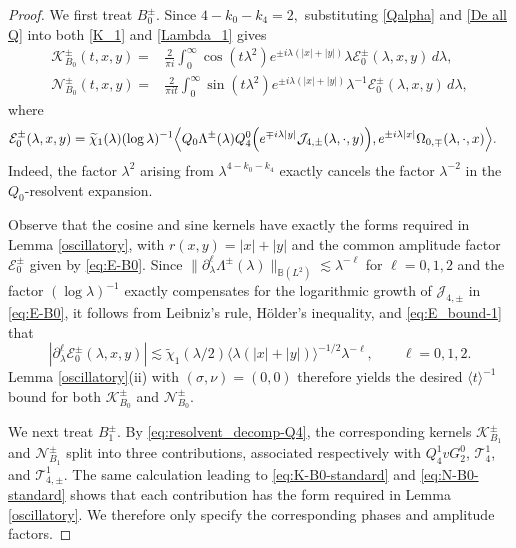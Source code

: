\documentclass[reqno]{amsart}
\numberwithin{equation}{section}
\begin{document}
\begin{proof}
	We first treat $B_0^\pm$. Since
	$
	4-k_0-k_4=2,
	$
	substituting \eqref{Qalpha} and \eqref{De all Q} into both
	\eqref{K_1} and \eqref{Lambda_1} gives
	\begin{align}
		\mathcal{K}_{B_0}^\pm(t,x,y)
		={}&
		\frac{2}{\pi i}
		\int_0^\infty
		\cos(t\lambda^2)
		e^{\pm i\lambda(|x|+|y|)}
		\lambda
		\mathcal{E}_{0}^\pm(\lambda,x,y)
		\,d\lambda,
		\label{eq:K-B0-standard}\\
			\mathcal{N}_{B_0}^\pm(t,x,y)
		={}&
		\frac{2}{\pi it}
		\int_0^\infty
		\sin(t\lambda^2)
		e^{\pm i\lambda(|x|+|y|)}
		\lambda^{-1}
		\mathcal{E}_{0}^\pm(\lambda,x,y)
		\,d\lambda,
		\label{eq:N-B0-standard}
	\end{align}
	where
	\begin{align}
		\mathcal{E}_{0}^\pm(\lambda,x,y)
		={}&
		\widetilde{\chi}_1(\lambda)
		(\log\lambda)^{-1}
		\Bigl\langle
		Q_0\Lambda^\pm(\lambda)Q_4^0
		\Bigl(
		e^{\mp i\lambda|y|}
		\mathcal{J}_{4,\pm}(\lambda,\cdot,y)
		\Bigr),
		e^{\pm i\lambda|x|}
		\Omega_{0,\mp}(\lambda,\cdot,x)
		\Bigr\rangle.
		\label{eq:E-B0}
	\end{align}
	Indeed, the factor $\lambda^2$ arising from
	$\lambda^{4-k_0-k_4}$ exactly cancels the factor $\lambda^{-2}$
	in the $Q_0$-resolvent expansion.
	
	Observe that  the cosine and sine kernels have exactly the forms required in
	Lemma \ref{oscillatory}, with
	$
	r(x,y)=|x|+|y|
	$
	and the common amplitude factor $\mathcal{E}_{0}^\pm$ given by
	\eqref{eq:E-B0}.
Since $\|\partial_\lambda^\ell \Lambda^\pm(\lambda)\|_{\mathbb{B}(L^2)} \lesssim \lambda^{-\ell}$ for $\ell=0,1,2$ and the factor $(\log\lambda)^{-1}$ exactly compensates for the logarithmic growth of $\mathcal{J}_{4,\pm}$ in \eqref{eq:E-B0}, it follows from Leibniz's rule, H\"older's inequality, and \eqref{eq:E_bound-1} that
	\begin{equation*}
		\left|
		\partial_\lambda^\ell
		\mathcal{E}_{0}^\pm(\lambda,x,y)
		\right|
		\lesssim
		\widetilde{\chi}_1(\lambda/2)
		\langle\lambda(|x|+|y|)\rangle^{-1/2}
		\lambda^{-\ell},
		\qquad
		\ell=0,1,2.
	\end{equation*}
 Lemma
	\ref{oscillatory}(ii) with $(\sigma,\nu)=(0,0)$ therefore yields
	the desired $\langle t\rangle^{-1}$ bound for both
	$\mathcal{K}_{B_0}^\pm$ and $\mathcal{N}_{B_0}^\pm$.
	
	We next treat $B_1^\pm$. By
	\eqref{eq:resolvent_decomp-Q4}, the corresponding kernels 	$\mathcal{K}_{B_1}^\pm$ and $\mathcal{N}_{B_1}^\pm$ split into
	three contributions, associated respectively with
	$Q_4^1vG_2^0$, $\mathcal{T}_4^1$, and
	$\mathcal{T}_{4,\pm}^1$. The same calculation leading to
	\eqref{eq:K-B0-standard} and \eqref{eq:N-B0-standard} shows that each
	contribution has the form required in Lemma \ref{oscillatory}. We
	therefore only specify the corresponding phases and amplitude factors.
	

\end{proof}
\end{document}
